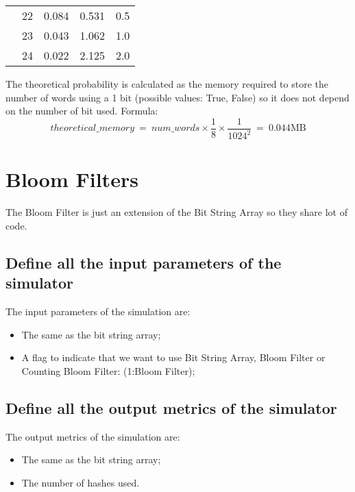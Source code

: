\documentclass{report}
\begin{document}
{\begin{table}[h!]
\begin{tabular}{|c|c|c|c|c|}
						                                                                                     & 22 & 0.084        & 0.531 & 0.5  \\ \cline{2-5} 
						                                                                                     & 23 & 0.043        & 1.062 & 1.0  \\ \cline{2-5} 
						                                                                                     & 24 & 0.022        & 2.125 & 2.0 \\ \hline
				\end{tabular}
		\end{table}
		The theoretical probability is calculated as the memory required to store the number of words using a 1 bit (possible values: True, False) so it does not depend on the number of bit used. Formula:
		\[ theoretical\_memory \: = \: num\_words \times \frac{1}{8} \times \frac{1}{1024^2} \: = \: 0.044 \text{MB}\]
		
		
		\newpage
		
					\section{Bloom Filters}	 
	 				The Bloom Filter is just an extension of the Bit String Array so they share lot of code. 
				\subsection{Define all the input parameters of the simulator}
					The input parameters of the simulation are:
					\begin{itemize}
						\item The same as the bit string array;
						\item A flag to indicate that we want to use Bit String Array, Bloom Filter or Counting Bloom Filter: (1:Bloom Filter);
					\end{itemize}
					 
				\subsection{Define all the output metrics of the simulator}
				The output metrics of the simulation are:
				\begin{itemize}
					\item The same as the bit string array;
					\item The number of hashes used.
				\end{itemize}
			
}
\end{document}
